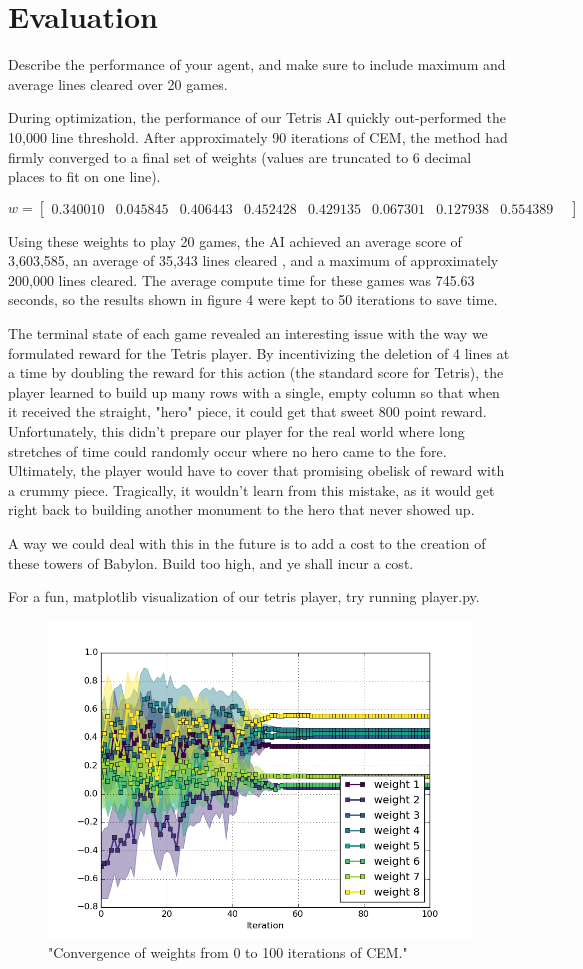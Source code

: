 \documentclass[12pt,letterpaper]{article}
\begin{document}
\section{Evaluation}
Describe the performance of your agent, and make sure to include maximum and average lines cleared over 20 games.

During optimization, the performance of our Tetris AI quickly out-performed the 10,000 line threshold. After approximately 90 iterations of CEM, the method had firmly converged to a final set of weights (values are truncated to 6 decimal places to fit on one line).

\[w = \begin{bmatrix}
    0.340010 &
    0.045845 &
    0.406443 &
    0.452428 &
    0.429135 &
    0.067301 &
    0.127938 &
    0.554389 &
  \end{bmatrix}\]

Using these weights to play 20 games, the AI achieved an average score of 3,603,585, an average of 35,343 lines cleared , and a maximum of approximately 200,000 lines cleared. The average compute time for these games was 745.63 seconds, so the results shown in figure 4 were kept to 50 iterations to save time.

The terminal state of each game revealed an interesting issue with the way we formulated reward for the Tetris player. By incentivizing the deletion of 4 lines at a time by doubling the reward for this action (the standard score for Tetris), the player learned to build up many rows with a single, empty column so that when it received the straight, "hero" piece, it could get that sweet 800 point reward. Unfortunately, this didn't prepare our player for the real world where long stretches of time could randomly occur where no hero came to the fore. Ultimately, the player would have to cover that promising obelisk of reward with a crummy piece. Tragically, it wouldn't learn from this mistake, as it would get right back to building another monument to the hero that never showed up.

A way we could deal with this in the future is to add a cost to the creation of these towers of Babylon. Build too high, and ye shall incur a cost.

For a fun, matplotlib visualization of our tetris player, try running player.py.

\begin{figure}[h!]
  \centering
  \includegraphics[width=0.7\linewidth]{weights.png}
  \caption{"Convergence of weights from 0 to 100 iterations of CEM."}
\end{figure}
\end{document}
